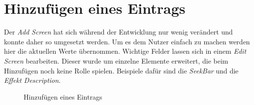 \documentclass[
    DIV12,
    cleardouble=plain,
    headings=normal,
    pdftex,
    headexclude,footexclude,
    final
]{scrreprt}
\begin{document}
\newpage
\section{Hinzufügen eines Eintrags}
Der \textit{Add Screen} hat sich während der Entwicklung nur wenig verändert und konnte daher so umgesetzt werden. Um es dem Nutzer einfach zu machen werden hier die aktuellen Werte übernommen.
Wichtige Felder lassen sich in einem \textit{Edit Screen} bearbeiten. Dieser wurde um einzelne Elemente erweitert, die beim Hinzufügen noch keine Rolle spielen. Beispiele dafür sind die \textit{SeekBar} und die \textit{Effekt Description}.
\begin{figure}[H]
	\centering
	\caption{Hinzufügen eines Eintrags}
	\label{add_entwurf}
\end{figure}

\newpage
\end{document}
